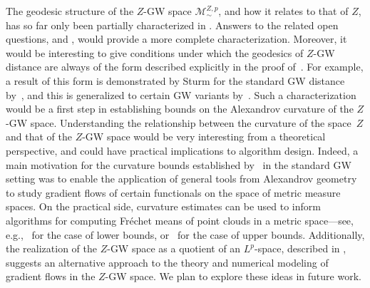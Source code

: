 \documentclass[twoside,11pt]{article}
\theoremstyle{definition}
\newcommand{\M}{\mathcal{M}}
\newcommand{\MZp}{\M_{\sim}^{Z,p}}
\begin{document}
\smallskip
{} The geodesic structure of the $Z$-GW space $\MZp$, and how it relates to that of $Z$, has so far only been  partially characterized in . Answers to the related open questions,  and , would provide a more complete characterization.  Moreover, it would be interesting to give conditions under which the geodesics of $Z$-GW distance are always of the form described explicitly in the proof of~. For example, a result of this form is demonstrated by Sturm for the standard GW distance by~\citet{sturm2023space}, and this is generalized to certain GW variants by~\citet{vayer2020fused,chowdhury2023hypergraph,zhang2024geometry,zhang2024topological}. Such a characterization would be a first step in establishing bounds on the Alexandrov curvature of the $Z$-GW space. Understanding the relationship between the curvature of the space~$Z$ and that of the $Z$-GW space would be very interesting from a theoretical perspective, and could have practical implications to algorithm design. Indeed, a main motivation for the  curvature bounds established by~\citet{sturm2023space} in the standard GW setting was to enable the application of general tools from Alexandrov geometry to study gradient flows of certain functionals on the space of metric measure spaces. On the practical side, curvature estimates can be used to inform algorithms for computing Fr\'{e}chet means of point clouds in a metric space---see, e.g.,~\citet{turner2014frechet,chowdhury2020gromov,zhang2024geometry} for the case of lower bounds, or~\citet{feragen2011means,bacak2014computing} for the case of upper bounds. Additionally, the realization of the $Z$-GW space as a quotient of an $L^p$-space,  described in , suggests an alternative approach to the theory and numerical modeling of gradient flows in the $Z$-GW space. We plan to explore these ideas in future work.
\end{document}
